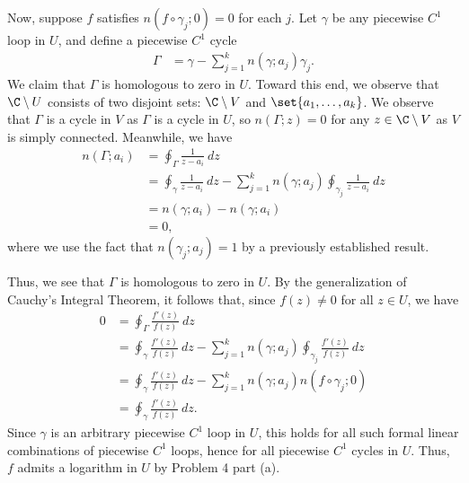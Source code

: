 \documentclass[10pt]{mypackage}
\begin{document}
\begin{solution}
\begin{enumerate}[(a)]
      Now, suppose $f$ satisfies $n\left( f\circ\gamma_j;0 \right) = 0$ for each $j$. Let $\gamma$ be any piecewise $C^{1}$ loop in $U$, and define a piecewise $C^{1}$ cycle
      \begin{align*}
        \Gamma &= \gamma - \sum_{j=1}^{k}n\left( \gamma;a_j \right) \gamma_j.
      \end{align*}
      We claim that $\Gamma$ is homologous to zero in $U$. Toward this end, we observe that $\C\setminus U$ consists of two disjoint sets: $\C\setminus V$ and $\set{a_1,\dots,a_k}$. We observe that $\Gamma$ is a cycle in $V$ as $\Gamma$ is a cycle in $U$, so $n\left( \Gamma;z \right) = 0$ for any $z\in\C\setminus V$ as $V$ is simply connected. Meanwhile, we have
      \begin{align*}
        n\left( \Gamma;a_i \right) &= \oint_{\Gamma}^{} \frac{1}{z-a_i}\:dz\\
                                   &= \oint_{\gamma}^{} \frac{1}{z-a_i}\:dz - \sum_{j=1}^{k} n\left( \gamma;a_j \right)\oint_{\gamma_j}^{} \frac{1}{z-a_i}\:dz\\
                                   &= n\left( \gamma;a_i \right) - n\left( \gamma;a_i \right)\\
                                   &= 0,
      \end{align*}
      where we use the fact that $n\left( \gamma_j;a_j \right) = 1$ by a previously established result.\newline

      Thus, we see that $\Gamma$ is homologous to zero in $U$. By the generalization of Cauchy's Integral Theorem, it follows that, since $f(z)\neq 0$ for all $z\in U$, we have
      \begin{align*}
        0 &= \oint_{\Gamma}^{} \frac{f'(z)}{f(z)}\:dz\\
          &= \oint_{\gamma}^{} \frac{f'(z)}{f(z)}\:dz - \sum_{j=1}^{k} n\left( \gamma;a_j \right) \oint_{\gamma_j}^{} \frac{f'(z)}{f(z)}\:dz\\
          &= \oint_{\gamma}^{} \frac{f'(z)}{f(z)}\:dz - \sum_{j=1}^{k} n\left( \gamma;a_j \right)n\left( f\circ\gamma_j;0 \right)\\
          &= \oint_{\gamma}^{} \frac{f'(z)}{f(z)}\:dz.
      \end{align*}
      Since $\gamma$ is an arbitrary piecewise $C^{1}$ loop in $U$, this holds for all such formal linear combinations of piecewise $C^{1}$ loops, hence for all piecewise $C^{1}$ cycles in $U$. Thus, $f$ admits a logarithm in $U$ by Problem 4 part (a).
  \end{enumerate}
\end{solution}
\end{document}
